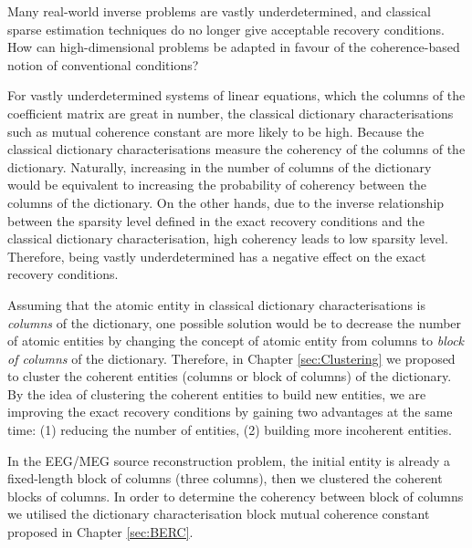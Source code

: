 \setcounter{challenge}{0}
\begin{tcolorbox}
\begin{challenge}
Many real-world inverse problems are vastly underdetermined, and classical sparse estimation techniques do no longer give acceptable recovery conditions.
How can high-dimensional problems be adapted in favour of the coherence-based notion of conventional conditions?
\end{challenge}
\end{tcolorbox}

For vastly underdetermined systems of linear equations, which the columns of the coefficient matrix are great in number, the classical dictionary characterisations such as mutual coherence constant are more likely to be high.
Because the classical dictionary characterisations measure the coherency of the columns of the dictionary.
Naturally, increasing in the number of columns of the dictionary would be equivalent to increasing the probability of coherency between the columns of the dictionary.
On the other hands, due to the inverse relationship between the sparsity level defined in the exact recovery conditions and the classical dictionary characterisation, high coherency leads to low sparsity level.
Therefore, being vastly underdetermined has a negative effect on the exact recovery conditions.

Assuming that the atomic entity in classical dictionary characterisations is \emph{columns} of the dictionary, one possible solution would be to decrease the number of atomic entities by changing the concept of atomic entity from columns to \emph{block of columns} of the dictionary.
Therefore, in Chapter \ref{sec:Clustering} we proposed to cluster the coherent entities (columns or block of columns) of the dictionary.
By the idea of clustering the coherent entities to build new entities, we are improving the exact recovery conditions by gaining two advantages at the same time: (1) reducing the number of entities, (2) building more incoherent entities.

In the EEG/MEG source reconstruction problem, the initial entity is already a fixed-length block of columns (three columns), then we clustered the coherent blocks of columns.
In order to determine the coherency between block of columns we utilised the dictionary characterisation block mutual coherence constant proposed in Chapter \ref{sec:BERC}.

